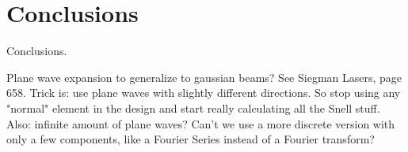 \cleardoublepage
\chapter{Conclusions}
Conclusions.

Plane wave expansion to generalize to gaussian beams?
See Siegman Lasers, page 658.
Trick is: use plane waves with slightly different directions.
So stop using any "normal" element in the design and start really calculating all the Snell stuff.
Also: infinite amount of plane waves?  Can't we use a more discrete version with only a few components, like a Fourier Series instead of a Fourier transform?
